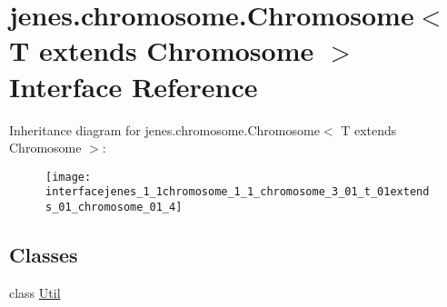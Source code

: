 \hypertarget{interfacejenes_1_1chromosome_1_1_chromosome_3_01_t_01extends_01_chromosome_01_4}{\section{jenes.\-chromosome.\-Chromosome$<$ T extends Chromosome $>$ Interface Reference}
\label{interfacejenes_1_1chromosome_1_1_chromosome_3_01_t_01extends_01_chromosome_01_4}
}
Inheritance diagram for jenes.\-chromosome.\-Chromosome$<$ T extends Chromosome $>$\-:\begin{figure}[H]
\begin{center}
\leavevmode
\texttt{[image: interfacejenes\_1\_1chromosome\_1\_1\_chromosome\_3\_01\_t\_01extends\_01\_chromosome\_01\_4]}
\end{center}
\end{figure}
\subsection*{Classes}
\begin{DoxyCompactItemize}
\item 
class \hyperlink{classjenes_1_1chromosome_1_1_chromosome_3_01_t_01extends_01_chromosome_01_4_1_1_util}{Util}
\end{DoxyCompactItemize}
